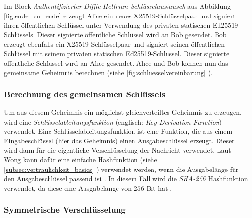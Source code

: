 Im Block \textit{Authentifizierter Diffie-Hellman Schlüsselaustausch} aus Abbildung \ref{fig:ende_zu_ende} erzeugt Alice ein neues X25519-Schlüsselpaar und signiert ihren öffentlichen Schlüssel unter Verwendung des privaten statischen Ed25519-Schlüssels. Dieser signierte öffentliche Schlüssel wird an Bob gesendet. Bob erzeugt ebenfalls ein X25519-Schlüsselpaar und signiert seinen öffentlichen Schlüssel mit seinem privaten statischen Ed25519-Schlüssel. Dieser signierte öffentliche Schlüssel wird an Alice gesendet. Alice und Bob können nun das gemeinsame Geheimnis berechnen (siehe \ref{fig:schluesselvereinbarung} \textit{}).

\subsubsection{Berechnung des gemeinsamen Schlüssels}

Um aus diesem Geheimnis ein möglichst gleichverteiltes Geheimnis zu erzeugen, wird eine \textit{Schlüsselableitungsfunktion} (englisch: \textit{Key Derivation Function}) verwendet. Eine Schlüsselableitungsfunktion ist eine Funktion, die aus einem Eingabeschlüssel (hier das Geheimnis) einen Ausgabeschlüssel erzeugt. Dieser wird dann für die eigentliche Verschlüsselung der Nachricht verwendet. Laut Wong kann dafür eine einfache Hashfunktion (siehe \ref{subsec:vertraulichkeit_basics} \textit{}) verwendet werden, wenn die Ausgabelänge für den Ausgabeschlüssel passend ist \Parencite[S. 194]{Wong_KryptoPraxis}. In diesem Fall wird die \textit{SHA-256} Hashfunktion verwendet, da diese eine Ausgabelänge von $256$ Bit hat \Parencite{rfc6234_SHA2}.


\subsubsection{Symmetrische Verschlüsselung}






